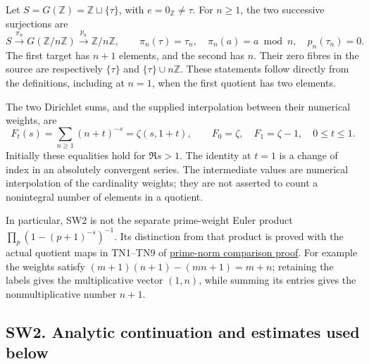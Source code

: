 \documentclass[
  10pt,
  a4paper,
]{article}
\begin{document}
Let \(S=G(\mathbb Z)=\mathbb Z\sqcup\{\tau\}\), with
\(e=0_{\mathbb Z}\ne\tau\). For \(n\ge1\), the two successive
surjections are \[
S\xrightarrow{\pi_n}G(\mathbb Z/n\mathbb Z)
\xrightarrow{p_n}\mathbb Z/n\mathbb Z,
\qquad
\pi_n(\tau)=\tau_n,\quad \pi_n(a)=a\bmod n,
\quad p_n(\tau_n)=0.
\tag{SW1}
\] The first target has \(n+1\) elements, and the second has \(n\).
Their zero fibres in the source are respectively \(\{\tau\}\) and
\(\{\tau\}\cup n\mathbb Z\). These statements follow directly from the
definitions, including at \(n=1\), when the first quotient has two
elements.

The two Dirichlet sums, and the supplied interpolation between their
numerical weights, are \[
F_t(s)=\sum_{n\ge1}(n+t)^{-s}=\zeta(s,1+t),\qquad
F_0=\zeta,\quad F_1=\zeta-1,
\quad 0\le t\le1.
\tag{SW2}
\] Initially these equalities hold for \(\Re s>1\). The identity at
\(t=1\) is a change of index in an absolutely convergent series. The
intermediate values are numerical interpolation of the cardinality
weights; they are not asserted to count a nonintegral number of elements
in a quotient.

In particular, SW2 is not the separate prime-weight Euler product
\(\prod_p(1-(p+1)^{-s})^{-1}\). Its distinction from that product is
proved with the actual quotient maps in TN1--TN9 of
\href{https://github.com/KokunoYumeto/zeta-function-research-reader/blob/173dbc6ed5a03235dbe7654f928f3692107db39b/workbenches/splitzero-tandem/branches/tau-zero-prime-positivity/TAU_WEIL_NORM_RECONSTRUCTION.md}{prime-norm
comparison proof}. For example the weights satisfy
\((m+1)(n+1)-(mn+1)=m+n\); retaining the labels gives the multiplicative
vector \((1,n)\), while summing its entries gives the nonmultiplicative
number \(n+1\).

\subsection{SW2. Analytic continuation and estimates used
below}\label{sw2.-analytic-continuation-and-estimates-used-below}
\end{document}
